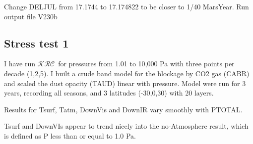 \documentclass{article}  %
\newcommand{\krc}{$\mathcal{KRC}$~}    %
\begin{document}
Change DELJUL from 17.1744 to 17.174822 to be closer to 1/40 MarsYear.
Run output file V230b

\subsection{Stress test 1}%

 I have run \krc for pressures from 1.01 to 10,000 Pa with three points per
 decade (1,2,5). I built a crude band model for the blockage by CO2 gas (CABR)
 and scaled the dust opacity (TAUD) linear with pressure. Model were run for 3
 years, recording all seasons, and 3 latitudes (-30,0,30) with 20 layers.

Results for Tsurf, Tatm, DownVis and DownIR vary smoothly with PTOTAL.

Tsurf and DownVIs appear to trend nicely into the no-Atmosphere result, which is
defined as P less than or equal to 1.0 Pa.

   

\appendix  %
\end{document}
